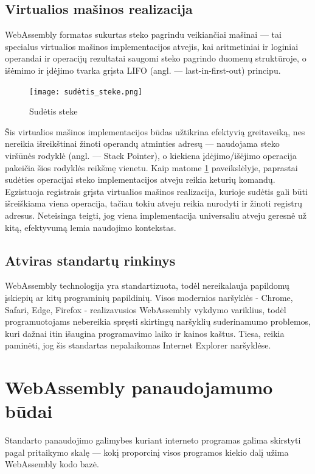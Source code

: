 \documentclass{VUMIFPSkursinis}
\begin{document}
\subsection{Virtualios mašinos realizacija}

WebAssembly formatas sukurtas steko pagrindu veikiančiai mašinai — tai specialus virtualios mašinos implementacijos atvejis, kai aritmetiniai ir loginiai operandai ir operacijų rezultatai saugomi steko pagrindo duomenų struktūroje, o išėmimo ir įdėjimo tvarka grįsta LIFO (angl. — last-in-first-out) principu. 

\begin{figure}[h!]
  \begin{center}
  \texttt{[image: sudėtis\_steke.png]}
  \end{center}
  \caption{Sudėtis steke}
  \label{fig:stack_addition}
\end{figure}

Šis virtualios mašinos implementacijos būdas užtikrina efektyvią greitaveiką, nes nereikia išreikštinai žinoti operandų atminties adresų — naudojama steko viršūnės rodyklė (angl. — Stack Pointer), o kiekiena įdėjimo/išėjimo operacija pakeičia šios rodyklės reikšmę vienetu.
Kaip matome \ref{fig:stack_addition} paveikslėlyje, paprastai sudėties operacijai steko implementacijos atveju reikia keturių komandų. Egzistuoja registrais grįsta virtualios mašinos realizacija, kurioje sudėtis gali būti išreiškiama viena operacija, tačiau tokiu atveju reikia nurodyti ir žinoti registrų adresus. \cite{MSS12} Neteisinga teigti, jog viena implementacija universaliu atveju geresnė už kitą, efektyvumą lemia naudojimo kontekstas.

\subsection{Atviras standartų rinkinys}
WebAssembly technologija yra standartizuota, todėl nereikalauja papildomų įskiepių ar kitų programinių papildinių. Visos modernios naršyklės - Chrome, Safari, Edge, Firefox - realizavusios WebAssembly vykdymo variklius, todėl programuotojams nebereikia spręsti skirtingų naršyklių suderinamumo problemos, kuri dažnai itin išaugina programavimo laiko ir kainos kaštus. Tiesa, reikia paminėti, jog šis standartas nepalaikomas Internet Explorer naršyklėse. 
\section{WebAssembly panaudojamumo būdai}
Standarto panaudojimo galimybes kuriant interneto programas galima skirstyti pagal pritaikymo skalę — kokį proporcinį visos programos kiekio dalį užima WebAssembly kodo bazė.
\end{document}
